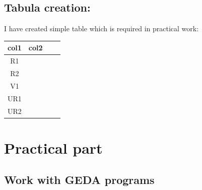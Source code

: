 \documentclass{report}
\begin{document}
 \section{Tabula creation:}
 I have created simple table which is required in practical work:
 
 \begin{center}
\begin{tabular}{ |c|c|c|c| } 
\hline
col1 & col2 \\
\hline
R1  &  \\ 
\hline
R2 &  \\ 
\hline
V1 &  \\ 
\hline
UR1 &  \\ 
\hline
UR2 & \\ 
\hline
\end{tabular}
\end{center}

 
 \chapter{Practical part}
\section{Work with GEDA programs} 
\end{document}

